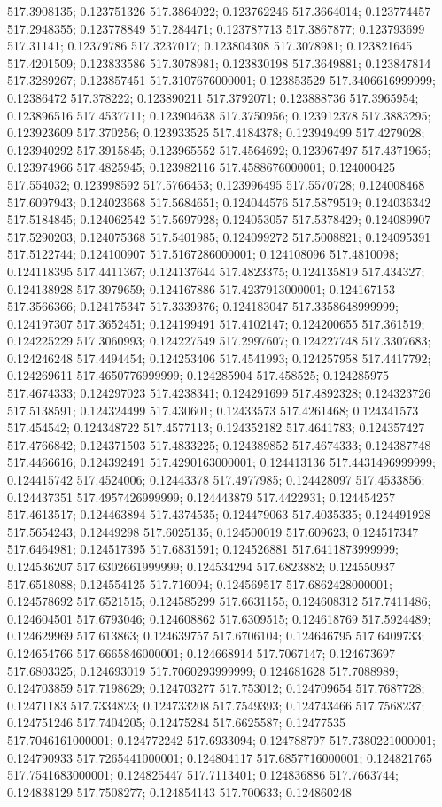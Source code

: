 517.3908135; 0.123751326 517.3864022; 0.123762246 517.3664014; 0.123774457 517.2948355; 0.123778849 517.284471; 0.123787713 517.3867877; 0.123793699 517.31141; 0.12379786 517.3237017; 0.123804308 517.3078981; 0.123821645 517.4201509; 0.123833586 517.3078981; 0.123830198 517.3649881; 0.123847814 517.3289267; 0.123857451 517.3107676000001; 0.123853529 517.3406616999999; 0.12386472 517.378222; 0.123890211 517.3792071; 0.123888736 517.3965954; 0.123896516 517.4537711; 0.123904638 517.3750956; 0.123912378 517.3883295; 0.123923609 517.370256; 0.123933525 517.4184378; 0.123949499 517.4279028; 0.123940292 517.3915845; 0.123965552 517.4564692; 0.123967497 517.4371965; 0.123974966 517.4825945; 0.123982116 517.4588676000001; 0.124000425 517.554032; 0.123998592 517.5766453; 0.123996495 517.5570728; 0.124008468 517.6097943; 0.124023668 517.5684651; 0.124044576 517.5879519; 0.124036342 517.5184845; 0.124062542 517.5697928; 0.124053057 517.5378429; 0.124089907 517.5290203; 0.124075368 517.5401985; 0.124099272 517.5008821; 0.124095391 517.5122744; 0.124100907 517.5167286000001; 0.124108096 517.4810098; 0.124118395 517.4411367; 0.124137644 517.4823375; 0.124135819 517.434327; 0.124138928 517.3979659; 0.124167886 517.4237913000001; 0.124167153 517.3566366; 0.124175347 517.3339376; 0.124183047 517.3358648999999; 0.124197307 517.3652451; 0.124199491 517.4102147; 0.124200655 517.361519; 0.124225229 517.3060993; 0.124227549 517.2997607; 0.124227748 517.3307683; 0.124246248 517.4494454; 0.124253406 517.4541993; 0.124257958 517.4417792; 0.124269611 517.4650776999999; 0.124285904 517.458525; 0.124285975 517.4674333; 0.124297023 517.4238341; 0.124291699 517.4892328; 0.124323726 517.5138591; 0.124324499 517.430601; 0.12433573 517.4261468; 0.124341573 517.454542; 0.124348722 517.4577113; 0.124352182 517.4641783; 0.124357427 517.4766842; 0.124371503 517.4833225; 0.124389852 517.4674333; 0.124387748 517.4466616; 0.124392491 517.4290163000001; 0.124413136 517.4431496999999; 0.124415742 517.4524006; 0.12443378 517.4977985; 0.124428097 517.4533856; 0.124437351 517.4957426999999; 0.124443879 517.4422931; 0.124454257 517.4613517; 0.124463894 517.4374535; 0.124479063 517.4035335; 0.124491928 517.5654243; 0.12449298 517.6025135; 0.124500019 517.609623; 0.124517347 517.6464981; 0.124517395 517.6831591; 0.124526881 517.6411873999999; 0.124536207 517.6302661999999; 0.124534294 517.6823882; 0.124550937 517.6518088; 0.124554125 517.716094; 0.124569517 517.6862428000001; 0.124578692 517.6521515; 0.124585299 517.6631155; 0.124608312 517.7411486; 0.124604501 517.6793046; 0.124608862 517.6309515; 0.124618769 517.5924489; 0.124629969 517.613863; 0.124639757 517.6706104; 0.124646795 517.6409733; 0.124654766 517.6665846000001; 0.124668914 517.7067147; 0.124673697 517.6803325; 0.124693019 517.7060293999999; 0.124681628 517.7088989; 0.124703859 517.7198629; 0.124703277 517.753012; 0.124709654 517.7687728; 0.12471183 517.7334823; 0.124733208 517.7549393; 0.124743466 517.7568237; 0.124751246 517.7404205; 0.12475284 517.6625587; 0.12477535 517.7046161000001; 0.124772242 517.6933094; 0.124788797 517.7380221000001; 0.124790933 517.7265441000001; 0.124804117 517.6857716000001; 0.124821765 517.7541683000001; 0.124825447 517.7113401; 0.124836886 517.7663744; 0.124838129 517.7508277; 0.124854143 517.700633; 0.124860248 